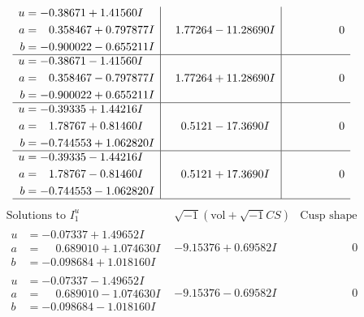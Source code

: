 \documentclass[1p]{elsarticle_modified}
\theoremstyle{definition}
\newcommand{\I}{\sqrt{-1}}
\begin{document}
$$\begin{array}{c|c|c}
\begin{aligned}
u &= -0.38671 + 1.41560 I \\
a &= \phantom{-}0.358467 + 0.797877 I \\
b &= -0.900022 - 0.655211 I\end{aligned}
 & \phantom{-}1.77264 - 11.28690 I & \phantom{-0.000000 } 0 \\ \hline\begin{aligned}
u &= -0.38671 - 1.41560 I \\
a &= \phantom{-}0.358467 - 0.797877 I \\
b &= -0.900022 + 0.655211 I\end{aligned}
 & \phantom{-}1.77264 + 11.28690 I & \phantom{-0.000000 } 0 \\ \hline\begin{aligned}
u &= -0.39335 + 1.44216 I \\
a &= \phantom{-}1.78767 + 0.81460 I \\
b &= -0.744553 + 1.062820 I\end{aligned}
 & \phantom{-}0.5121 - 17.3690 I & \phantom{-0.000000 } 0 \\ \hline\begin{aligned}
u &= -0.39335 - 1.44216 I \\
a &= \phantom{-}1.78767 - 0.81460 I \\
b &= -0.744553 - 1.062820 I\end{aligned}
 & \phantom{-}0.5121 + 17.3690 I & \phantom{-0.000000 } 0\\
 \hline 
 \end{array}$$\newpage$$\begin{array}{c|c|c}  
\text{Solutions to }I^u_{1}& \I (\text{vol} + \sqrt{-1}CS) & \text{Cusp shape}\\
 \hline 
\begin{aligned}
u &= -0.07337 + 1.49652 I \\
a &= \phantom{-}0.689010 + 1.074630 I \\
b &= -0.098684 + 1.018160 I\end{aligned}
 & -9.15376 + 0.69582 I & \phantom{-0.000000 } 0 \\ \hline\begin{aligned}
u &= -0.07337 - 1.49652 I \\
a &= \phantom{-}0.689010 - 1.074630 I \\
b &= -0.098684 - 1.018160 I\end{aligned}
 & -9.15376 - 0.69582 I & \phantom{-0.000000 } 0 \\ \hline\begin{aligned}

\end{aligned}
\end{array}$$
\end{document}
